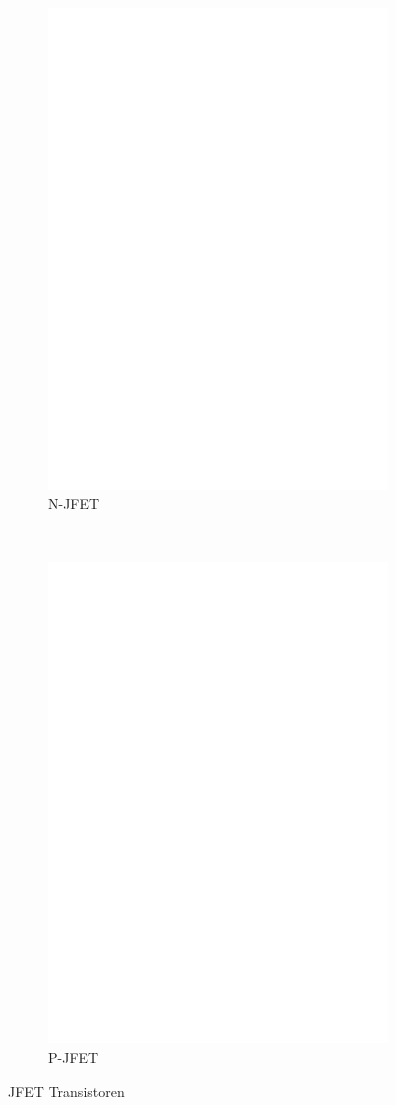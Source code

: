\begin{figure}[H]
  \begin{subfigure}[b]{9cm}
    \centering
    \includegraphics[width=9cm]{../FIG/JFET_BF245.eps}
    \caption{N-JFET}
    \label{fig:N-JFET}
  \end{subfigure}
  ~
  \begin{subfigure}[b]{9cm}
    \centering
    \includegraphics[width=9cm]{../FIG/JFET_J175.eps}
    \caption{P-JFET}
    \label{fig:P-JFET}
  \end{subfigure}
  \caption{JFET Transistoren}
\end{figure}



